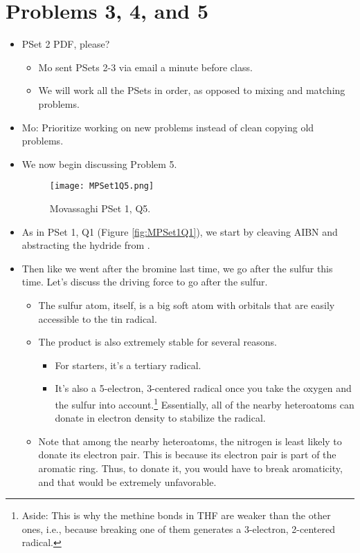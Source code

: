 \documentclass[../notes.tex]{subfiles}
\begin{document}
\section{Problems 3, 4, and 5}
\begin{itemize}
    \item {}PSet 2 PDF, please?
    \begin{itemize}
        \item Mo sent PSets 2-3 via email a minute before class.
        \item We will work all the PSets in order, as opposed to mixing and matching problems.
    \end{itemize}
    \item Mo: Prioritize working on new problems instead of clean copying old problems.
    \item We now begin discussing Problem 5.
    \begin{figure}[h!]
        \centering
        \texttt{[image: MPSet1Q5.png]}
        \caption{Movassaghi PSet 1, Q5.}
        \label{fig:MPSet1Q5}
    \end{figure}
    \item As in PSet 1, Q1 (Figure \ref{fig:MPSet1Q1}), we start by cleaving AIBN and abstracting the hydride from .
    \item Then like we went after the bromine last time, we go after the sulfur this time. Let's discuss the driving force to go after the sulfur.
    \begin{itemize}
        \item The sulfur atom, itself, is a big soft atom with orbitals that are easily accessible to the tin radical.
        \item The product is also extremely stable for several reasons.
        \begin{itemize}
            \item For starters, it's a tertiary radical.
            \item It's also a 5-electron, 3-centered radical once you take the oxygen and the sulfur into account.\footnote{Aside: This is why the methine  bonds in THF are weaker than the other ones, i.e., because breaking one of them generates a 3-electron, 2-centered radical.} Essentially, all of the nearby heteroatoms can donate in electron density to stabilize the radical.
        \end{itemize}
        \item Note that among the nearby heteroatoms, the nitrogen is least likely to donate its electron pair. This is because its electron pair is part of the aromatic ring. Thus, to donate it, you would have to break aromaticity, and that would be extremely unfavorable.

\end{itemize}
\end{itemize}
\end{document}

